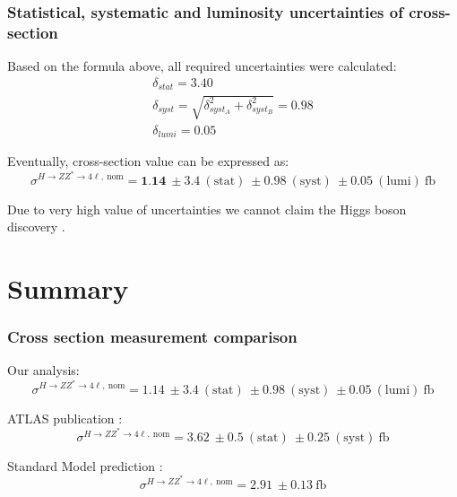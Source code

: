 \documentclass[aspectratio=1610, english]{beamer}
\newcommand{\hzz}{ H\rightarrow ZZ^{*}\rightarrow 4 \ell}
\begin{document}
\begin{frame}
\frametitle{Statistical, systematic and luminosity uncertainties of cross-section}
Based on the formula above, all required uncertainties were calculated:
\begin{eqnarray}
    \delta_{stat}=3.40 \nonumber \\
    \delta_{syst}=\sqrt{\delta_{syst_A}^2 +\delta_{syst_B}^2}=0.98 \nonumber \\
    \delta_{lumi}=0.05 \nonumber
\end{eqnarray}

Eventually, cross-section value can be expressed as: 
\begin{equation}
\sigma^{\hzz, \: \mathrm{nom}}=\textbf{1.14} \: \pm 3.4 \: \mathrm{(stat)} \: \pm 0.98 \: \mathrm{(syst)} \: \pm 0.05 \: \mathrm{(lumi) \: fb}
\end{equation}

Due to very high value of uncertainties we cannot claim the Higgs boson discovery \frownie .
\end{frame}

\section{Summary}

\begin{frame}
\frametitle{Cross section measurement comparison}

Our analysis:
\begin{equation}
\sigma^{\hzz, \: \mathrm{nom}}=1.14 \: \pm 3.4 \: \mathrm{(stat)} \: \pm 0.98 \: \mathrm{(syst)} \: \pm 0.05 \: \mathrm{(lumi) \: fb}
\end{equation}

ATLAS publication \cite{hzz}:
\begin{equation}
\sigma^{\hzz, \: \mathrm{nom}}=3.62 \: \pm 0.5 \: \mathrm{(stat)} \: \pm 0.25 \: \mathrm{(syst)} \: \mathrm{fb}
\end{equation}

Standard Model prediction \cite{hzz}:
\begin{equation}
\sigma^{\hzz, \: \mathrm{nom}}=2.91 \: \pm 0.13  \: \mathrm{fb}
\end{equation}

\end{frame}
\end{document}

